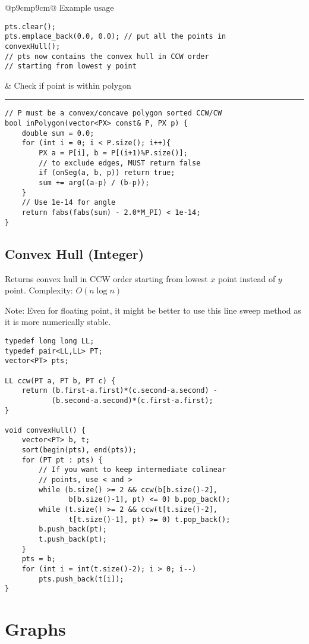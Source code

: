 \documentclass[letterpaper]{article}
\newcommand{\rx}[1]{#1\hrule}
\begin{document}
\begin{tabular}{@{}p{9cm}p{9cm}@{}}
    Example usage
    \begin{lstlisting}
pts.clear();
pts.emplace_back(0.0, 0.0); // put all the points in
convexHull();
// pts now contains the convex hull in CCW order
// starting from lowest y point
\end{lstlisting}
     &
    \rx{Check if point is within polygon}
    \begin{lstlisting}
// P must be a convex/concave polygon sorted CCW/CW
bool inPolygon(vector<PX> const& P, PX p) {
	double sum = 0.0;
	for (int i = 0; i < P.size(); i++){
		PX a = P[i], b = P[(i+1)%P.size()];
		// to exclude edges, MUST return false
		if (onSeg(a, b, p)) return true;
		sum += arg((a-p) / (b-p));
	}
	// Use 1e-14 for angle
	return fabs(fabs(sum) - 2.0*M_PI) < 1e-14;
}
\end{lstlisting}

    \subsection{Convex Hull (Integer)}

    Returns convex hull in CCW order starting from lowest $x$ point instead of $y$ point. Complexity: $O\left(n\log n\right)$

    Note: Even for floating point, it might be better to use this line sweep method as it is more numerically stable.

    \begin{lstlisting}
typedef long long LL;
typedef pair<LL,LL> PT;
vector<PT> pts;

LL ccw(PT a, PT b, PT c) {
	return (b.first-a.first)*(c.second-a.second) -
	       (b.second-a.second)*(c.first-a.first);
}

void convexHull() {
	vector<PT> b, t;
	sort(begin(pts), end(pts));
	for (PT pt : pts) {
		// If you want to keep intermediate colinear
		// points, use < and >
		while (b.size() >= 2 && ccw(b[b.size()-2],
		       b[b.size()-1], pt) <= 0) b.pop_back();
		while (t.size() >= 2 && ccw(t[t.size()-2],
		       t[t.size()-1], pt) >= 0) t.pop_back();
		b.push_back(pt);
		t.push_back(pt);
	}
	pts = b;
	for (int i = int(t.size()-2); i > 0; i--)
		pts.push_back(t[i]);
}
\end{lstlisting}
\end{tabular}

\clearpage

\section{Graphs}
\end{document}
